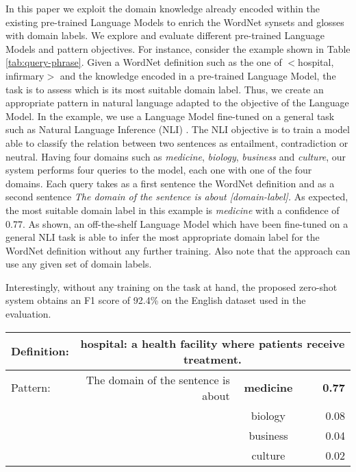 \documentclass[11pt]{article}
\begin{document}
In this paper we exploit the domain knowledge already encoded within the existing pre-trained Language Models to enrich the WordNet \citep{miller1998wordnet} synsets and glosses with domain labels. We explore and evaluate different pre-trained Language Models and pattern objectives. For instance, consider the example shown in Table \ref{tab:query-phrase}. Given a WordNet definition such as the one of $<$hospital, infirmary$>$ and the knowledge encoded in a pre-trained Language Model, the task is to assess which is its most suitable domain label. Thus, we create an appropriate pattern in natural language adapted to the objective of the Language Model. In the example, we use a Language Model fine-tuned on a general task such as Natural Language Inference (NLI) \cite{bowman2015large}. The NLI objective is to train a model able to classify the relation between two sentences as entailment, contradiction or neutral. Having four domains such as {\it medicine}, {\it biology}, {\it business} and {\it culture}, our system performs four queries to the model, each one with one of the four domains. Each query takes as a first sentence the WordNet definition and as a second sentence {\it The domain of the sentence is about [domain-label].} As expected, the most suitable domain label in this example is {\it medicine} with a confidence of 0.77. As shown, an off-the-shelf Language Model which have been fine-tuned on a general NLI task is able to infer the most appropriate domain label for the WordNet definition without any further training. Also note that the approach can use any given set of domain labels.

Interestingly, without any training on the task at hand, the proposed zero-shot system obtains an F1 score of 92.4\% on the English dataset used in the evaluation.

\begin{table*}[!ht]
    \centering
\begin{tabularx}{0.77\linewidth}{lrclr}
        \toprule
        Definition: & \multicolumn{4}{c}{hospital: a health facility where patients receive treatment.} \\
        \midrule
        Pattern: & The domain of the sentence is about & \textbf{medicine} &   & \textbf{0.77} \\
                     &                                     & biology  &   & 0.08 \\
                     &                                     & business &   & 0.04 \\
                     &                                     & culture  &   & 0.02 \\
\bottomrule
    \end{tabularx}
\caption{An example of domain labelling.}
    \label{tab:query-phrase}
\end{table*}
\end{document}
